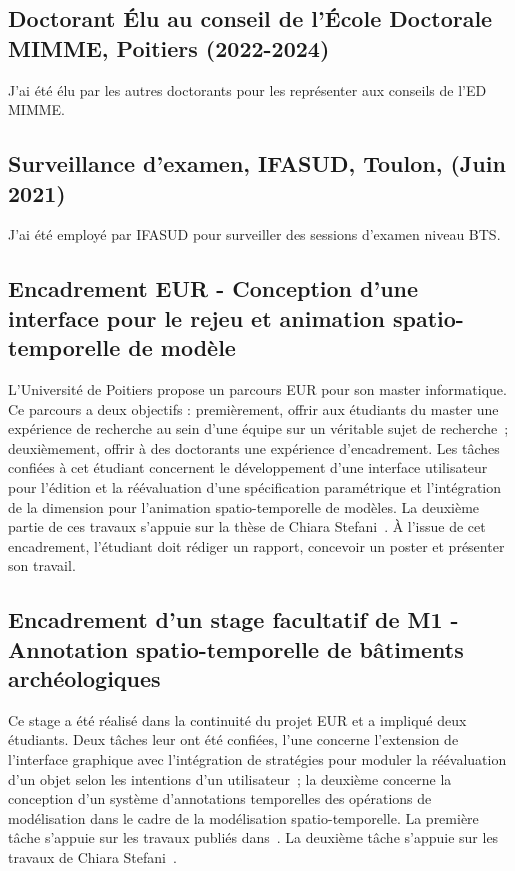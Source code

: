 \documentclass[11pt,a4paper,oneside]{article}
\begin{document}
\subsection{Doctorant Élu au conseil de l'École Doctorale MIMME, Poitiers (2022-2024)}
J'ai été élu par les autres doctorants pour les
représenter aux conseils de l'ED MIMME.

\subsection{Surveillance d'examen, IFASUD, Toulon, (Juin 2021)}{
	J'ai été employé par IFASUD pour surveiller des sessions d'examen niveau BTS. %
}

\subsection{Encadrement EUR - Conception d'une interface pour le rejeu et
	animation spatio-temporelle de modèle}
L'Université de Poitiers propose un parcours EUR pour son master
informatique. %
Ce parcours a deux objectifs : premièrement, offrir aux étudiants du master
une expérience de recherche au sein d'une équipe sur un véritable sujet de
recherche~; deuxièmement, offrir à des doctorants une expérience
d'encadrement. %
Les tâches confiées à cet étudiant concernent le développement d'une interface
utilisateur pour l'édition et la réévaluation d'une spécification paramétrique
et l'intégration de la dimension pour l'animation spatio-temporelle de
modèles. %
La deuxième partie de ces travaux s'appuie sur la thèse de Chiara
Stefani~\cite{stefani2010}. %
À l'issue de cet encadrement, l'étudiant doit rédiger un rapport, concevoir un
poster et présenter son travail. %

\subsection{Encadrement d'un stage facultatif de M1 - Annotation
	spatio-temporelle de bâtiments archéologiques}
Ce stage a été réalisé dans la continuité du projet EUR et a impliqué deux
étudiants. %
Deux tâches leur ont été confiées, l'une concerne l'extension de l'interface
graphique avec l'intégration de stratégies pour moduler la réévaluation d'un
objet selon les intentions d'un utilisateur~; la deuxième concerne la conception
d'un système d'annotations temporelles des opérations de modélisation dans le
cadre de la modélisation spatio-temporelle. %
La première tâche s'appuie sur les travaux publiés
dans~\cite{gaide2024reevaluation}. %
La deuxième tâche s'appuie sur les travaux de Chiara Stefani~\cite{stefani2010}.
\end{document}
